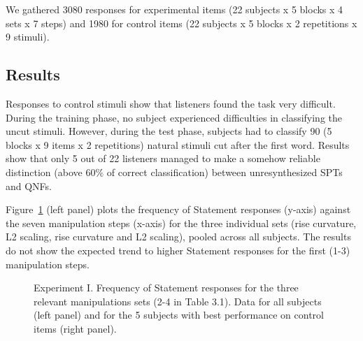 We gathered 3080 responses for experimental items (22 subjects x 5 blocks x 4 sets x 7 steps) and 1980 for control items (22 subjects x 5 blocks x 2 repetitions x 9 stimuli).

\subsection{Results}\label{sec322}
Responses to control stimuli show that listeners found the task very difficult. During the training phase, no subject experienced difficulties in classifying the uncut stimuli. However, during the test phase, subjects had to classify 90 (5 blocks x 9 items x 2 repetitions) natural stimuli cut after the first word. Results show that only 5 out of 22 listeners managed to make a somehow reliable distinction (above 60\% of correct classification) between unresynthesized SPTs and QNFs.

Figure~\ref{fig305} (left panel) plots the frequency of Statement responses (y-axis) against the seven manipulation steps (x-axis) for the three individual sets (rise curvature, L2 scaling, rise curvature and L2 scaling), pooled across all subjects. The results do not show the expected trend to higher Statement responses for the first (1-3) manipulation steps. 

\begin{figure}
\centering
{}
\caption{Experiment I. Frequency of Statement responses for the three relevant manipulations sets (2-4 in Table 3.1). Data for all subjects (left panel) and for the 5 subjects with best performance on control items (right panel).}
\label{fig305}\end{figure}

